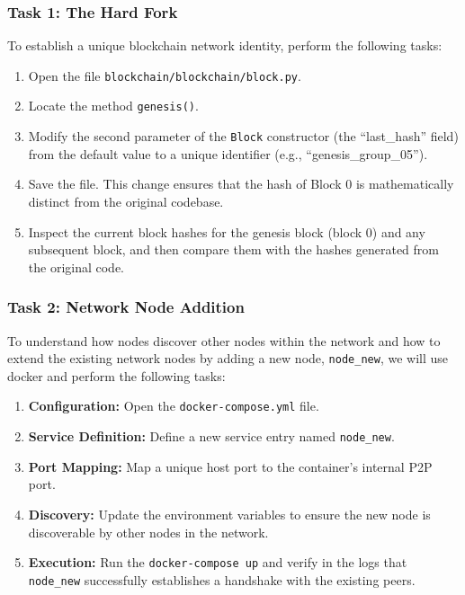 \subsubsection*{Task 1: The Hard Fork}
To establish a unique blockchain network identity, perform the following tasks:
\begin{enumerate}
    \item Open the file \texttt{blockchain/blockchain/block.py}.
    \item Locate the method \texttt{genesis()}.
    \item Modify the second parameter of the \texttt{Block} constructor (the  \enquote{last\_hash} field) from the default value to a unique identifier (e.g.,  \enquote{genesis\_group\_05}).
    \item Save the file. This change ensures that the hash of Block 0 is mathematically distinct from the original codebase.
    \item Inspect the current block hashes for the genesis block (block 0) and any subsequent block, and then compare them with the hashes generated from the original code.
\end{enumerate}

\subsubsection*{Task 2: Network Node Addition} 
To understand how nodes discover other nodes within the network and how to extend the existing network nodes by adding a new node, \texttt{node\_new}, we will use docker and perform the following tasks:
\begin{enumerate}
    \item \textbf{Configuration:} Open the \texttt{docker-compose.yml} file.
    \item \textbf{Service Definition:} Define a new service entry named \texttt{node\_new}.
    \item \textbf{Port Mapping:} Map a unique host port to the container's internal P2P port.
    \item \textbf{Discovery:} Update the environment variables to ensure the new node is discoverable by other nodes in the network.
    \item \textbf{Execution:} Run the \texttt{docker-compose up} and verify in the logs that \texttt{node\_new} successfully establishes a handshake with the existing peers.
\end{enumerate}

\newpage

